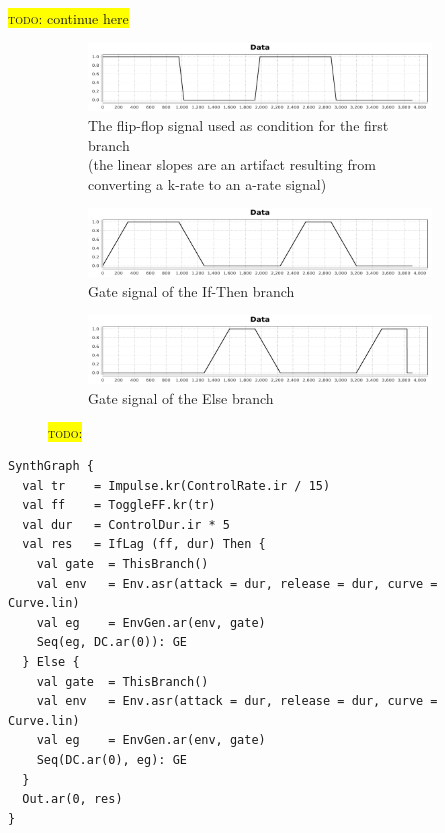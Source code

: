 \documentclass[11pt,a4paper]{article}
\newcommand{\todo}[1]{\colorbox{yellow}{\textsc{todo}: #1}}
\begin{document}
\todo{continue here}

\begin{figure}
\centering
\begin{subfigure}[b]{1.0\textwidth}%
\includegraphics[width=\textwidth,trim=0 0 25mm 8mm,clip]{figures/iflag-cond-1.pdf}
\caption{The flip-flop signal used as condition for the first branch \\\phantom{(a) }(the linear slopes are an artifact resulting from converting a k-rate to an a-rate signal)}\label{fig:iflag-cond-1}
\end{subfigure}
\begin{subfigure}[b]{1.0\textwidth}%
\includegraphics[width=\textwidth,trim=0 0 25mm 8mm,clip]{figures/iflag-gate-1.pdf}
\caption{Gate signal of the If-Then branch}\label{fig:iflag-gate-1}
\end{subfigure}
\begin{subfigure}[b]{1.0\textwidth}%
\includegraphics[width=\textwidth,trim=0 0 25mm 8mm,clip]{figures/iflag-gate-2.pdf}
\caption{Gate signal of the Else branch}\label{fig:iflag-gate-1}
\end{subfigure}
\caption{\todo{}}
\label{fig:iflag-gate}
\end{figure}

\begin{verbatim}
SynthGraph {
  val tr    = Impulse.kr(ControlRate.ir / 15)
  val ff    = ToggleFF.kr(tr)
  val dur   = ControlDur.ir * 5
  val res   = IfLag (ff, dur) Then {
    val gate  = ThisBranch()
    val env   = Env.asr(attack = dur, release = dur, curve = Curve.lin)
    val eg    = EnvGen.ar(env, gate)
    Seq(eg, DC.ar(0)): GE
  } Else {
    val gate  = ThisBranch()
    val env   = Env.asr(attack = dur, release = dur, curve = Curve.lin)
    val eg    = EnvGen.ar(env, gate)
    Seq(DC.ar(0), eg): GE
  }
  Out.ar(0, res)
}
\end{verbatim}
\end{document}
